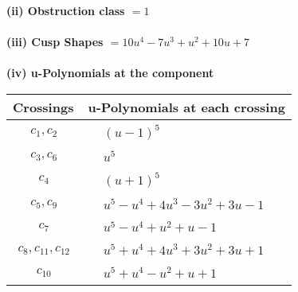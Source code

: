 \documentclass[1p]{elsarticle_modified}
\theoremstyle{definition}
\begin{document}
\flushleft \textbf{(ii) Obstruction class $= 1$}\\~\\
\flushleft \textbf{(iii) Cusp Shapes $= 10 u^4-7 u^3+u^2+10 u+7$}\\~\\
\newpage\renewcommand{\arraystretch}{1}
\flushleft \textbf{(iv) u-Polynomials at the component}\newline \\
\begin{tabular}{m{50pt}|m{274pt}}
Crossings & \hspace{64pt}u-Polynomials at each crossing \\
\hline $$\begin{aligned}c_{1},c_{2}\end{aligned}$$&$\begin{aligned}
&(u-1)^5
\end{aligned}$\\
\hline $$\begin{aligned}c_{3},c_{6}\end{aligned}$$&$\begin{aligned}
&u^5
\end{aligned}$\\
\hline $$\begin{aligned}c_{4}\end{aligned}$$&$\begin{aligned}
&(u+1)^5
\end{aligned}$\\
\hline $$\begin{aligned}c_{5},c_{9}\end{aligned}$$&$\begin{aligned}
&u^5- u^4+4 u^3-3 u^2+3 u-1
\end{aligned}$\\
\hline $$\begin{aligned}c_{7}\end{aligned}$$&$\begin{aligned}
&u^5- u^4+u^2+u-1
\end{aligned}$\\
\hline $$\begin{aligned}c_{8},c_{11},c_{12}\end{aligned}$$&$\begin{aligned}
&u^5+u^4+4 u^3+3 u^2+3 u+1
\end{aligned}$\\
\hline $$\begin{aligned}c_{10}\end{aligned}$$&$\begin{aligned}
&u^5+u^4- u^2+u+1
\end{aligned}$\\
\hline
\end{tabular}\\~\\
\end{document}
